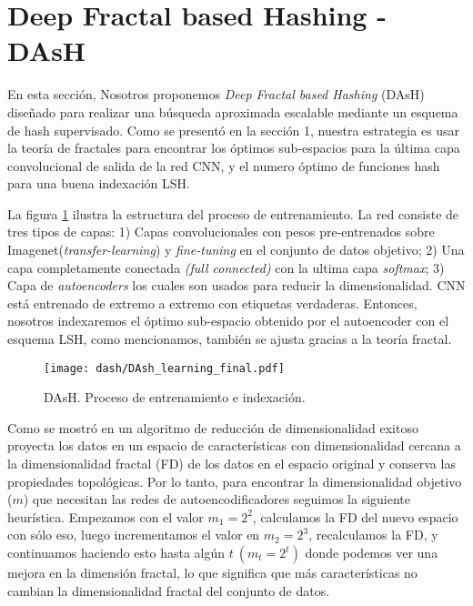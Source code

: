 
\section{Deep Fractal based  Hashing - DAsH}

En esta sección, Nosotros proponemos \textit{Deep Fractal based  Hashing} (DAsH) diseñado para realizar una búsqueda aproximada escalable mediante un esquema de hash supervisado. Como se presentó en la sección 1, nuestra estrategia es usar la teoría de fractales para encontrar los óptimos sub-espacios para la última capa convolucional de salida de la red CNN, y el numero óptimo de funciones hash para una buena indexación LSH. 

La figura \ref{fig:dash} ilustra la estructura del proceso de entrenamiento. La red consiste de tres tipos de capas: 1) Capas convolucionales con pesos pre-entrenados sobre Imagenet(\textit{transfer-learning}) y \textit{fine-tuning} en el conjunto de datos objetivo; 2) Una capa completamente conectada \textit{(full connected)} con la ultima capa \textit{softmax}; 3) Capa de \textit{autoencoders} los cuales son usados para reducir la dimensionalidad. \acf{CNN} está entrenado de extremo a extremo con etiquetas verdaderas.  Entonces, nosotros indexaremos el óptimo sub-espacio obtenido por el autoencoder con el esquema LSH, como mencionamos, también se ajusta gracias a la teoría fractal.  %
\begin{figure}[htp]\centering
\texttt{[image: dash/DAsh\_learning\_final.pdf]}
\caption{ DAsH. Proceso de entrenamiento e indexación. } 
\label{fig:dash}
\end{figure} 		

Como se mostró en \cite{citeulike:fractal:encoders} un algoritmo de reducción de dimensionalidad exitoso proyecta los datos en un espacio de características con dimensionalidad cercana a la dimensionalidad fractal (FD) de los datos en el espacio original y conserva las propiedades topológicas.  Por lo tanto, para encontrar la dimensionalidad objetivo ($m$) que necesitan las redes de autoencodificadores seguimos la siguiente heurística.  Empezamos con el valor $m_1 = 2^2$, calculamos la FD del nuevo espacio con sólo eso, luego incrementamos el valor en $m_2 = 2^3$, recalculamos la FD, y continuamos haciendo esto hasta algún $ t\ (m_t =  2^t)$ donde podemos ver una mejora en la dimensión fractal, lo que significa que más características no cambian la dimensionalidad fractal del conjunto de datos.
 

